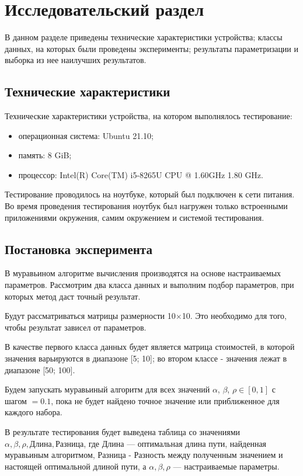 \chapter{Исследовательский раздел}
В данном разделе приведены технические характеристики устройства; классы данных, на которых были проведены эксперименты; результаты параметризации и выборка из нее наилучших результатов.
 
\section{Технические характеристики}
Технические характеристики устройства, на котором выполнялось тестирование:
\begin{itemize}
	\item операционная система: Ubuntu 21.10;
	\item память: 8 GiB;
	\item процессор: Intel(R) Core(TM) i5-8265U CPU @ 1.60GHz   1.80 GHz.
\end{itemize}
Тестирование проводилось на ноутбуке, который был подключен к сети питания. Во время проведения тестирования ноутбук был нагружен только встроенными приложениями окружения, самим окружением и системой тестирования.

\section{Постановка эксперимента}
В муравьином алгоритме вычисления производятся на основе настраиваемых параметров. Рассмотрим два класса данных и выполним подбор параметров, при которых метод даст точный результат.

Будут рассматриваться матрицы размерности 10$\times$10. Это необходимо для того, чтобы результат зависел от параметров.

В качестве первого класса данных будет является матрица стоимостей, в которой значения варьируются в диапазоне [5; 10]; во втором классе - значения лежат в диапазоне [50; 100].

Будем запускать муравьиный алгоритм для всех значений $\alpha$, $\beta$, $\rho \in [0,1]$ с шагом $= 0.1$, пока не будет найдено точное значение или приближенное для каждого набора.

В результате тестирования будет выведена таблица со значениями $\alpha, \beta, \rho, Длина, Разница$, где $Длина$ — оптимальная длина пути, найденная муравьиным алгоритмом, $Разница$ - Разность между полученным значением и настоящей оптимальной длиной пути, а $\alpha, \beta, \rho$ — настраиваемые параметры.

